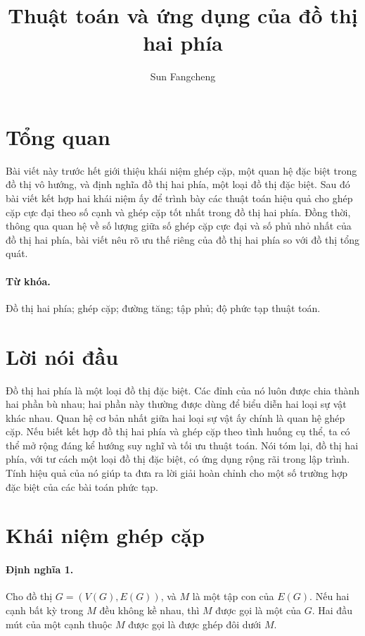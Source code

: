 \documentclass[11pt]{article}
\title{Thuật toán và ứng dụng của đồ thị hai phía}
\author{Sun Fangcheng}
\date{}
\begin{document}
\maketitle


\section*{Tổng quan}

Bài viết này trước hết giới thiệu khái niệm ghép cặp, một quan hệ đặc biệt
trong đồ thị vô hướng, và định nghĩa đồ thị hai phía, một loại đồ thị đặc
biệt. Sau đó bài viết kết hợp hai khái niệm ấy để trình bày các thuật toán
hiệu quả cho ghép cặp cực đại theo số cạnh và ghép cặp tốt nhất trong đồ thị
hai phía. Đồng thời, thông qua quan hệ về số lượng giữa số ghép cặp cực đại
và số phủ nhỏ nhất của đồ thị hai phía, bài viết nêu rõ ưu thế riêng của đồ
thị hai phía so với đồ thị tổng quát.

\paragraph{Từ khóa.}
Đồ thị hai phía; ghép cặp; đường tăng; tập phủ; độ phức tạp thuật toán.

\tableofcontents

\section{Lời nói đầu}

Đồ thị hai phía là một loại đồ thị đặc biệt. Các đỉnh của nó luôn được chia
thành hai phần bù nhau; hai phần này thường được dùng để biểu diễn hai loại
sự vật khác nhau. Quan hệ cơ bản nhất giữa hai loại sự vật ấy chính là quan
hệ ghép cặp. Nếu biết kết hợp đồ thị hai phía và ghép cặp theo tình huống cụ
thể, ta có thể mở rộng đáng kể hướng suy nghĩ và tối ưu thuật toán. Nói tóm
lại, đồ thị hai phía, với tư cách một loại đồ thị đặc biệt, có ứng dụng rộng
rãi trong lập trình. Tính hiệu quả của nó giúp ta đưa ra lời giải hoàn chỉnh
cho một số trường hợp đặc biệt của các bài toán phức tạp.

\section{Khái niệm ghép cặp}

\paragraph{Định nghĩa 1.}
Cho đồ thị \(G=(V(G),E(G))\), và \(M\) là một tập con của \(E(G)\). Nếu hai
cạnh bất kỳ trong \(M\) đều không kề nhau, thì \(M\) được gọi là một
 của \(G\). Hai đầu mút của một cạnh thuộc \(M\) được gọi là
được ghép đôi dưới \(M\).
\end{document}
